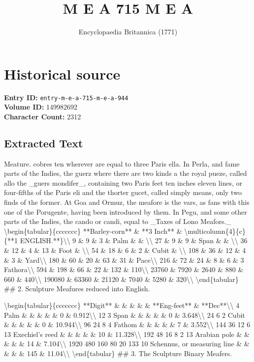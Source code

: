 \documentclass{article}
\title{M E A  715 M E A}
\date{Encyclopaedia Britannica (1771)}
\begin{document}
\maketitle

\section*{Historical source}
\textbf{Entry ID:} \texttt{entry-m-e-a-715-m-e-a-944} \\
\textbf{Volume ID:} 149982692 \\
\textbf{Character Count:} 2312

\subsection*{Extracted Text}
Meature. cobres ten wherever are equal to three Paris ella. In Perla, and fame parts of the Indies, the guerz where there are two kinds a the royal pueze, called allo the \_guers mondifer\_, containing two Paris feet ten inches eleven lines, or four-fifths of the Paris eli and the thorter gucet, called simply means, only two finds of the former. At Goa and Ormuz, the meafore is the vars, as fans with this one of the Porugente, having been introduced by them. In Pegu, and some other parts of the Indies, the cando or candi, equal to \_Taxes of Lono Meafors.\_ \textbackslash{}begin\{tabular\}\{ccccccc\}
**Barley-corn** \& **3 Inch** \& \textbackslash{}multicolumn\{4\}\{c\}\{**1 ENGLISH.**\}\textbackslash{}\textbackslash{}
9 \& 9 \& 3 \& Palm \& \& \textbackslash{}\textbackslash{}
27 \& 9 \& 9 \& Span \& \& \textbackslash{}\textbackslash{}
36 \& 12 \& 4 \& 13 \& Foot \& \textbackslash{}\textbackslash{}
54 \& 18 \& 6 \& 2 \& Cubit \& \textbackslash{}\textbackslash{}
108 \& 36 \& 12 \& 4 \& 3 \& Yard\textbackslash{}\textbackslash{}
180 \& 60 \& 20 \& 63 \& 31 \& Pace\textbackslash{}\textbackslash{}
216 \& 72 \& 24 \& 8 \& 6 \& 3 Fathora\textbackslash{}\textbackslash{}
594 \& 198 \& 66 \& 22 \& 132 \& 110\textbackslash{}\textbackslash{}
23760 \& 7920 \& 2640 \& 880 \& 660 \& 440\textbackslash{}\textbackslash{}
190080 \& 63360 \& 21120 \& 7040 \& 5280 \& 320\textbackslash{}\textbackslash{}
\textbackslash{}end\{tabular\} \#\# 2. Sculpture Meafures reduced into English.

\textbackslash{}begin\{tabular\}\{ccccccc\}
**Digit** \& \& \& \& \& **Eng-feet** \& **Dec**\textbackslash{}\textbackslash{}
4 Palm \& \& \& \& \& 0 \& 0.912\textbackslash{}\textbackslash{}
12 3 Span \& \& \& \& \& 0 \& 3.648\textbackslash{}\textbackslash{}
24 6 2 Cubit \& \& \& \& \& 0 \& 10.944\textbackslash{}\textbackslash{}
96 24 8 4 Fathom \& \& \& \& \& 7 \& 3.552\textbackslash{}\textbackslash{}
144 36 12 6 13 Exechiel's reed \& \& \& \& \& 10 \& 11.328\textbackslash{}\textbackslash{}
192 48 16 8 2 13 Arabian pole \& \& \& \& \& 14 \& 7.104\textbackslash{}\textbackslash{}
1920 480 160 80 20 133 10 Schennus, or measuring line \& \& \& \& \& 145 \& 11.04\textbackslash{}\textbackslash{}
\textbackslash{}end\{tabular\} \#\# 3. The Sculpture Binary Meafers.
\end{document}
